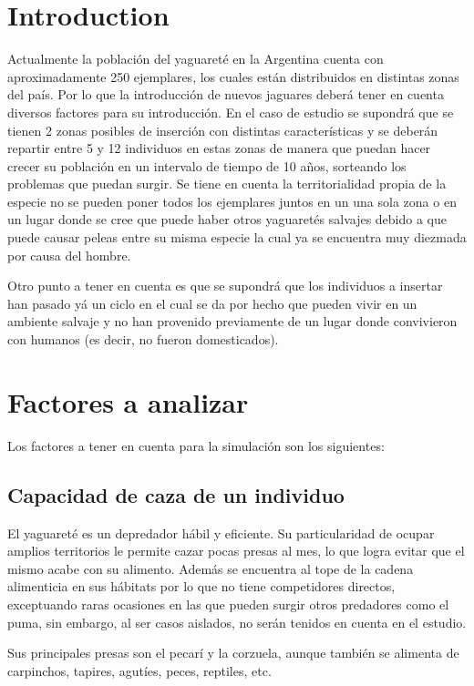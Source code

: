 \documentclass{article}
\begin{document}
\section{Introduction}
    Actualmente la población del yaguareté en la Argentina cuenta con aproximadamente 250 ejemplares, los cuales están distribuidos en distintas zonas del país. Por lo que la introducción de nuevos jaguares deberá tener en cuenta diversos factores para su introducción. En el caso de estudio se supondrá que se tienen 2 zonas posibles de inserción con distintas características y se deberán repartir entre 5 y 12 individuos en estas zonas de manera que puedan hacer crecer su población en un intervalo de tiempo de 10 años, sorteando los problemas que puedan surgir. Se tiene en cuenta la territorialidad propia de la especie no se pueden poner todos los ejemplares juntos en un una sola zona o en un lugar donde se cree que puede haber otros yaguaretés salvajes debido a que puede causar peleas entre su misma especie la cual ya se encuentra muy diezmada por causa del hombre.
    
    Otro punto a tener en cuenta es que se supondrá que los individuos a insertar han pasado yá un ciclo en el cual se da por hecho que pueden vivir en un ambiente salvaje y no han provenido previamente de un lugar donde convivieron con humanos (es decir, no fueron domesticados).

\section{Factores a analizar}
    Los factores a tener en cuenta para la simulación son los siguientes:
    
   \subsection{Capacidad de caza de un individuo}
    El yaguareté es un depredador hábil y eficiente. Su particularidad de ocupar amplios territorios le permite cazar pocas presas al mes, lo que logra evitar que el mismo acabe con su alimento. Además se encuentra al tope de la cadena alimenticia en sus hábitats por lo que no tiene competidores directos, exceptuando raras ocasiones en las que pueden surgir otros predadores como el puma, sin embargo, al ser casos aislados, no serán tenidos en cuenta en el estudio.
    
    Sus principales presas son el pecarí y la corzuela, aunque también se alimenta de carpinchos, tapires, agutíes, peces, reptiles, etc.
    
\end{document}
